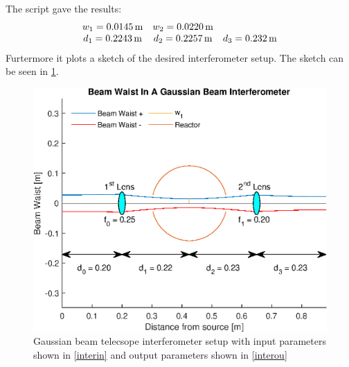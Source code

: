The script gave the results:
\begin{align}
	\mqty{w_1 = \SI{0.0145}{\meter} & w_2 = \SI{0.0220}{\meter}                                            \\
	d_1 = \SI{0.2243}{\meter}       & d_2 = \SI{0.2257}{\meter} & d_3 = \SI{0.232}{\meter}}\label{interou}
\end{align}
Furtermore it plots a sketch of the desired interferometer setup. The sketch can be seen in \cref{AWESOME}.
\begin{figure}
	\centering
	\includegraphics[width=.7\textwidth]{MatlabFigures/Interferometer/Interferometer.eps}
	\caption{Gaussian beam telecsope interferometer setup with input parameters shown in \cref{interin} and output parameters shown in \cref{interou}}
	\label{AWESOME}
\end{figure}
